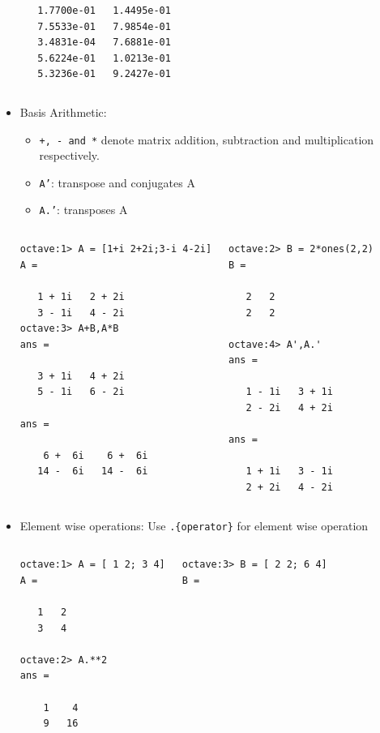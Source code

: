 \documentclass[slidestop,mathserif,compress,xcolor=svgnames]{beamer}
\begin{document}
\begin{frame}
\begin{itemize}
{\begin{columns}
\begin{verbatim}
   1.7700e-01   1.4495e-01
   7.5533e-01   7.9854e-01
   3.4831e-04   7.6881e-01
   5.6224e-01   1.0213e-01
   5.3236e-01   9.2427e-01
      \end{verbatim}
    \end{columns}
    }
    \item Basis Arithmetic:
    \begin{itemize}
      \item \texttt{+, - and *} denote matrix addition, subtraction and multiplication respectively.
      \item \texttt{A'}: transpose and conjugates A
      \item \texttt{A.'}: transposes A
    \end{itemize}
    {\tiny
      \begin{columns}
        \column{4cm}
        \begin{verbatim}
octave:1> A = [1+i 2+2i;3-i 4-2i]
A =

   1 + 1i   2 + 2i
   3 - 1i   4 - 2i
octave:3> A+B,A*B
ans =

   3 + 1i   4 + 2i
   5 - 1i   6 - 2i

ans =

    6 +  6i    6 +  6i
   14 -  6i   14 -  6i
        \end{verbatim}
        \column{4cm}
        \begin{verbatim}
octave:2> B = 2*ones(2,2) 
B =

   2   2
   2   2

octave:4> A',A.'
ans =

   1 - 1i   3 + 1i
   2 - 2i   4 + 2i

ans =

   1 + 1i   3 - 1i
   2 + 2i   4 - 2i
        \end{verbatim}
      \end{columns}
    }
    \framebreak
    \item Element wise operations: Use \texttt{.\{operator\}} for element wise operation
    {\tiny
      \begin{columns}
        \column{4cm}
        \begin{verbatim}
octave:1> A = [ 1 2; 3 4]
A =

   1   2
   3   4

octave:2> A.**2
ans =

    1    4
    9   16
        \end{verbatim}
        \column{4cm}
        \begin{verbatim}
octave:3> B = [ 2 2; 6 4]
B =


\end{verbatim}
\end{columns}}
\end{itemize}
\end{frame}
\end{document}
